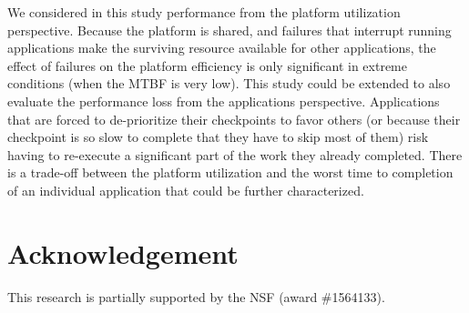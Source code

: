 \documentclass[two]{article}
\newcommand{\eg}[0]{\emph{e.g.}\xspace}
\begin{document}
We considered in this study performance from the platform utilization
perspective. Because the platform is shared, and failures that
interrupt running applications make the surviving resource available
for other applications, the effect of failures on the platform
efficiency is only significant in extreme conditions (when the MTBF is
very low). This study could be extended to also evaluate the
performance loss from the applications perspective. Applications that
are forced to de-prioritize their checkpoints to favor others (or
because their checkpoint is so slow to complete that they have to skip
most of them) risk having to re-execute a significant part of the work
they already completed. There is a trade-off between the platform
utilization and the worst time to completion of an individual application that
could be further characterized.


\section*{Acknowledgement}

This research is partially supported by the NSF (award \#1564133).




%
\end{document}
